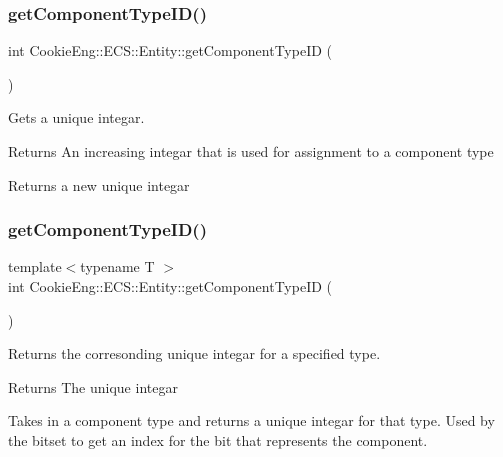\subsubsection{\texorpdfstring{get\+Component\+Type\+I\+D()}{getComponentTypeID()}\hspace{0.1cm}{\footnotesize\ttfamily [1/2]}}
{\footnotesize\ttfamily int Cookie\+Eng\+::\+E\+C\+S\+::\+Entity\+::get\+Component\+Type\+ID (\begin{DoxyParamCaption}{ }\end{DoxyParamCaption})\hspace{0.3cm}{\ttfamily [inline]}}



Gets a unique integar. 

\begin{DoxyReturn}{Returns}
An increasing integar that is used for assignment to a component type
\end{DoxyReturn}
Returns a new unique integar \mbox{\label{class_cookie_eng_1_1_e_c_s_1_1_entity_a6fcce356d5a9a67a785c4e80c155306d}} 
\subsubsection{\texorpdfstring{get\+Component\+Type\+I\+D()}{getComponentTypeID()}\hspace{0.1cm}{\footnotesize\ttfamily [2/2]}}
{\footnotesize\ttfamily template$<$typename T $>$ \\
int Cookie\+Eng\+::\+E\+C\+S\+::\+Entity\+::get\+Component\+Type\+ID (\begin{DoxyParamCaption}{ }\end{DoxyParamCaption})\hspace{0.3cm}{\ttfamily [inline]}}



Returns the corresonding unique integar for a specified type. 

\begin{DoxyReturn}{Returns}
The unique integar
\end{DoxyReturn}
Takes in a component type and returns a unique integar for that type. Used by the bitset to get an index for the bit that represents the component. \mbox{\label{class_cookie_eng_1_1_e_c_s_1_1_entity_a594daff6ddf321ac9c3a2fad3e50620e}} 
